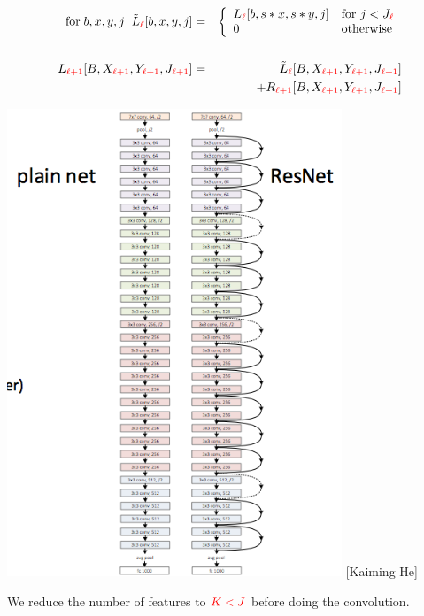 {\begin{eqnarray*}
\mathrm{for}\;b,x,y,j\;\;\tilde{L}_{\color{red} \ell}[b,x,y,j] & = & \left\{\begin{array}{ll} L_{\color{red} \ell}[b,s*x,s*y,j] & \mbox{for $j < J_{\color{red} \ell}$} \\ 0 & \mbox{otherwise} \end{array}\right.\\
\\
L_{\color{red} \ell+1}[B,X_{\color{red} \ell +1},Y_{\color{red} \ell+1},J_{\color{red}\ell +1}] & = & \tilde{L}_{\color{red} \ell}[B,X_{\color{red} \ell +1},Y_{\color{red} \ell+1},J_{\color{red}\ell +1}] \\
& & + R_{\color{red} \ell+1}[B,X_{\color{red} \ell +1},Y_{\color{red} \ell+1},J_{\color{red}\ell +1}]
\end{eqnarray*}


\centerline{\includegraphics[height= 5.5in]{../images/ResnetStack} {\large [Kaiming He]}}


We reduce the number of features to ${\color{red} K < J}$ before doing the convolution.

}
